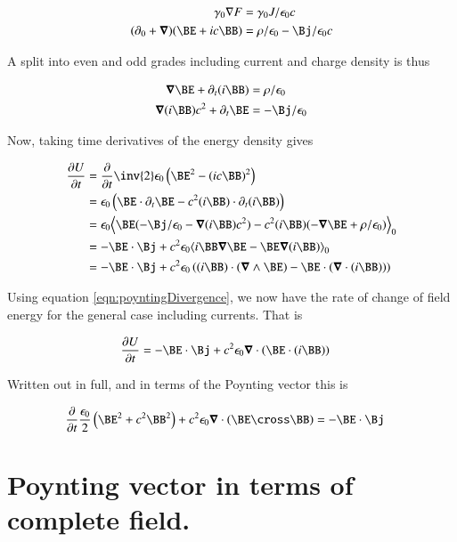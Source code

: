 \documentclass{article}
\begin{document}
\begin{align*}
\gamma_0 \grad F &= \gamma_0 J / \epsilon_0 c \\
(\partial_0 + \spacegrad) ( \BE + i c \BB ) &= \rho/\epsilon_0 - \Bj/\epsilon_0 c \\
\end{align*}
 
A split into even and odd grades including current and charge density is thus
 
\begin{align*}
\spacegrad \BE + \partial_t (i \BB) &= \rho/\epsilon_0 \\
\spacegrad (i \BB) c^2 + \partial_t \BE &= -\Bj/\epsilon_0
\end{align*}
 
Now, taking time derivatives of the energy density gives

\begin{align*}
\PD{t}{U} 
&= \PD{t}{}\inv{2} \epsilon_0 \left( \BE^2 - (ic \BB)^2 \right) \\
&= \epsilon_0 \left( \BE \cdot \partial_t \BE - c^2 (i\BB) \cdot \partial_t (i\BB) \right) \\
&= \epsilon_0 \gpgradezero{ \BE ( -\Bj/\epsilon_0 -\spacegrad (i \BB) c^2 ) - c^2 (i\BB) ( -\spacegrad \BE + \rho/\epsilon_0 ) } \\
&= -\BE \cdot \Bj + c^2 \epsilon_0 \gpgradezero{ i\BB \spacegrad \BE -\BE \spacegrad (i \BB) } \\
&= -\BE \cdot \Bj + c^2 \epsilon_0 \left( (i\BB) \cdot (\spacegrad \wedge \BE) - \BE \cdot (\spacegrad \cdot (i \BB)) \right) \\
\end{align*}

Using equation \ref{eqn:poyntingDivergence}, we now have the rate of change of
field energy for the general case including currents.  That is

\begin{align}
\PD{t}{U} &= -\BE \cdot \Bj + c^2 \epsilon_0 \spacegrad \cdot (\BE \cdot (i\BB)) 
\end{align}

Written out in full, and in terms of the Poynting vector this is

\begin{align}
\PD{t}{}\frac{\epsilon_0}{2} \left(\BE^2 + c^2 \BB^2\right) + c^2 \epsilon_0 \spacegrad \cdot (\BE \cross \BB) &= -\BE \cdot \Bj 
\end{align}

\section{ Poynting vector in terms of complete field. }
\end{document}

